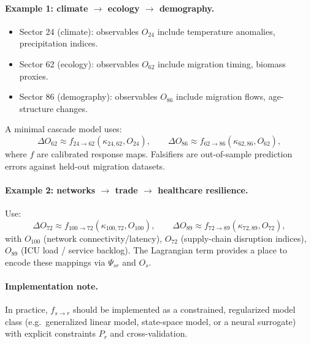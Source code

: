 \documentclass[13pt,a4paper]{article}
\begin{document}
	\paragraph{Example 1: climate $\rightarrow$ ecology $\rightarrow$ demography.}
	\begin{itemize}[leftmargin=*]
		\item Sector 24 (climate): observables $O_{24}$ include temperature anomalies, precipitation indices.
		\item Sector 62 (ecology): observables $O_{62}$ include migration timing, biomass proxies.
		\item Sector 86 (demography): observables $O_{86}$ include migration flows, age-structure changes.
	\end{itemize}
	A minimal cascade model uses:
	$$
	\Delta O_{62}\approx f_{24\to62}(\kappa_{24,62},O_{24}),\qquad
	\Delta O_{86}\approx f_{62\to86}(\kappa_{62,86},O_{62}),
	$$
	where $f$ are calibrated response maps. Falsifiers are out-of-sample prediction errors against held-out migration datasets.
	
	\paragraph{Example 2: networks $\rightarrow$ trade $\rightarrow$ healthcare resilience.}
	Use:
	$$
	\Delta O_{72}\approx f_{100\to72}(\kappa_{100,72},O_{100}),\qquad
	\Delta O_{89}\approx f_{72\to89}(\kappa_{72,89},O_{72}),
	$$
	with $O_{100}$ (network connectivity/latency), $O_{72}$ (supply-chain disruption indices), $O_{89}$ (ICU load / service backlog). The Lagrangian term provides a place to encode these mappings via $\Psi_{sr}$ and $O_s$.
	
	\paragraph{Implementation note.}
	In practice, $f_{s\to r}$ should be implemented as a constrained, regularized model class (e.g.\ generalized linear model, state-space model, or a neural surrogate) with explicit constraints $P_r$ and cross-validation.
	
\end{document}
